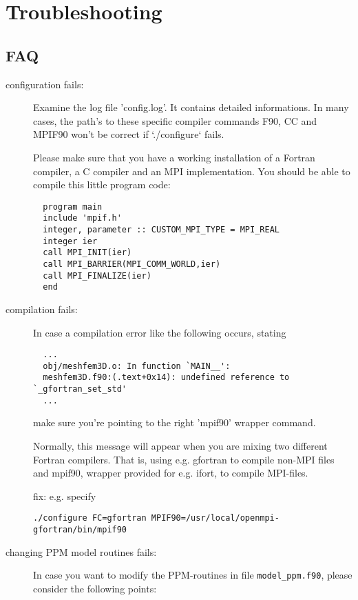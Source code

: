 \chapter{Troubleshooting}\label{cha:Troubleshooting}

\section*{FAQ}

\begin{description}
\item [configuration fails:]
Examine the log file 'config.log'. It contains detailed informations.
In many cases, the path's to these specific compiler commands F90,
CC and MPIF90 won't be correct if `./configure` fails.

Please make sure that you have a working installation of a Fortran compiler,
a C compiler and an MPI implementation. You should be able to compile this
little program code:

{\footnotesize
\begin{verbatim}
  program main
  include 'mpif.h'
  integer, parameter :: CUSTOM_MPI_TYPE = MPI_REAL
  integer ier
  call MPI_INIT(ier)
  call MPI_BARRIER(MPI_COMM_WORLD,ier)
  call MPI_FINALIZE(ier)
  end
\end{verbatim}
}

\item [compilation fails:]
In case a compilation error like the following occurs, stating

{\footnotesize
\begin{verbatim}
  ...
  obj/meshfem3D.o: In function `MAIN__':
  meshfem3D.f90:(.text+0x14): undefined reference to `_gfortran_set_std'
  ...
\end{verbatim}
}
\noindent
make sure you're pointing to the right 'mpif90' wrapper command.

Normally, this message will appear when you are mixing two different Fortran
compilers. That is, using e.g. gfortran to compile non-MPI files
and mpif90, wrapper provided for e.g. ifort, to compile MPI-files.

fix: e.g. specify
\begin{verbatim}
./configure FC=gfortran MPIF90=/usr/local/openmpi-gfortran/bin/mpif90
\end{verbatim}

\item [changing PPM model routines fails:]
In case you want to modify the PPM-routines in file \texttt{model\_ppm.f90}, please consider the following points:


\end{description}
